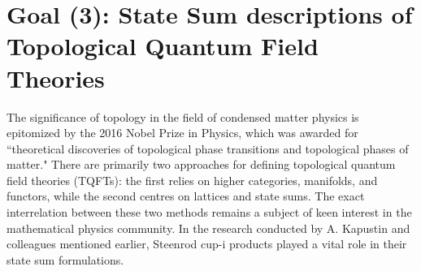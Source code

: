 
\section{Goal (3): State Sum descriptions of Topological Quantum Field Theories}

The significance of topology in the field of condensed matter physics is epitomized by the 2016 Nobel Prize in Physics, which was awarded for ``theoretical discoveries of topological phase transitions and topological phases of matter." There are primarily two approaches for defining topological quantum field theories (TQFTs): the first relies on higher categories, manifolds, and functors, while the second centres on lattices and state sums. The exact interrelation between these two methods remains a subject of keen interest in the mathematical physics community. In the research conducted by A. Kapustin and colleagues mentioned earlier, Steenrod cup-i products played a vital role in their state sum formulations.